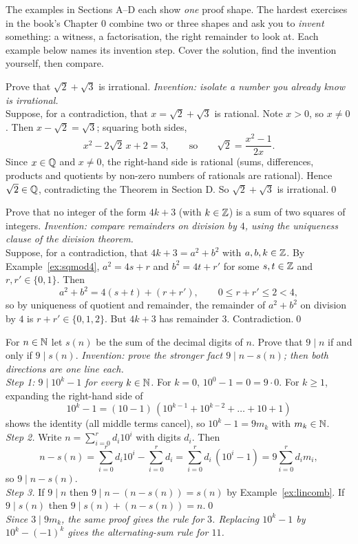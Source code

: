 The examples in Sections A--D each show \emph{one} proof shape. The hardest exercises in the book's Chapter 0 combine two or three shapes and ask you to \emph{invent} something: a witness, a factorisation, the right remainder to look at. Each example below names its invention step. Cover the solution, find the invention yourself, then compare.

\begin{bexample}
Prove that $\sqrt2+\sqrt3$ is irrational.
\solution
\emph{Invention: isolate a number you already know is irrational.}\\
Suppose, for a contradiction, that $x=\sqrt2+\sqrt3$ is rational. Note $x>0$, so $x\ne0$. Then $x-\sqrt2=\sqrt3$; squaring both sides,
\[
x^2-2\sqrt2\,x+2=3,\qquad\text{so}\qquad \sqrt2=\frac{x^2-1}{2x}.
\]
Since $x\in\mathbb{Q}$ and $x\ne0$, the right-hand side is rational (sums, differences, products and quotients by non-zero numbers of rationals are rational). Hence $\sqrt2\in\mathbb{Q}$, contradicting the Theorem in Section D. So $\sqrt2+\sqrt3$ is irrational.\qed
\end{bexample}

\begin{bexample}
Prove that no integer of the form $4k+3$ (with $k\in\mathbb{Z}$) is a sum of two squares of integers.
\solution
\emph{Invention: compare remainders on division by $4$, using the uniqueness clause of the division theorem.}\\
Suppose, for a contradiction, that $4k+3=a^2+b^2$ with $a,b,k\in\mathbb{Z}$. By Example~\ref{ex:sqmod4}, $a^2=4s+r$ and $b^2=4t+r'$ for some $s,t\in\mathbb{Z}$ and $r,r'\in\{0,1\}$. Then
\[
a^2+b^2=4(s+t)+(r+r'),\qquad 0\le r+r'\le2<4,
\]
so by uniqueness of quotient and remainder, the remainder of $a^2+b^2$ on division by $4$ is $r+r'\in\{0,1,2\}$. But $4k+3$ has remainder $3$. Contradiction.\qed
\end{bexample}

\begin{bexample}
For $n\in\mathbb{N}$ let $s(n)$ be the sum of the decimal digits of $n$. Prove that $9\mid n$ if and only if $9\mid s(n)$.
\solution
\emph{Invention: prove the stronger fact $9\mid n-s(n)$; then both directions are one line each.}\\
\emph{Step 1: $9\mid10^k-1$ for every $k\in\mathbb{N}$.} For $k=0$, $10^0-1=0=9\cdot0$. For $k\ge1$, expanding the right-hand side of
\[
10^k-1=(10-1)\,(10^{k-1}+10^{k-2}+\dots+10+1)
\]
shows the identity (all middle terms cancel), so $10^k-1=9m_k$ with $m_k\in\mathbb{N}$.\\
\emph{Step 2.} Write $n=\sum_{i=0}^rd_i10^i$ with digits $d_i$. Then
\[
n-s(n)=\sum_{i=0}^rd_i10^i-\sum_{i=0}^rd_i=\sum_{i=0}^rd_i\,(10^i-1)=9\sum_{i=0}^rd_im_i ,
\]
so $9\mid n-s(n)$.\\
\emph{Step 3.} If $9\mid n$ then $9\mid n-(n-s(n))=s(n)$ by Example~\ref{ex:lincomb}. If $9\mid s(n)$ then $9\mid s(n)+(n-s(n))=n$.\qed\\
\emph{Since $3\mid9m_k$, the same proof gives the rule for $3$. Replacing $10^k-1$ by $10^k-(-1)^k$ gives the alternating-sum rule for $11$.}
\end{bexample}

